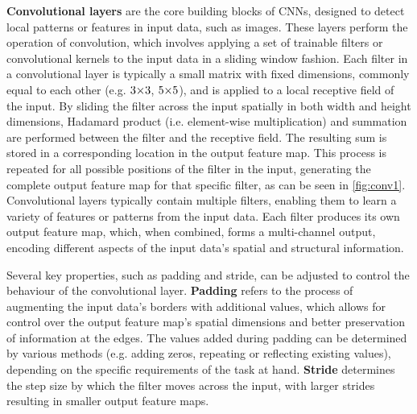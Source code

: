 \textbf{Convolutional layers} are the core building blocks of CNNs, designed to detect local patterns or features in input data, such as images. These layers perform the operation of convolution, which involves applying a set of trainable filters or convolutional kernels to the input data in a sliding window fashion. Each filter in a convolutional layer is typically a small matrix with fixed dimensions, commonly equal to each other (e.g. $3 {\times} 3$, $5 {\times} 5$), and is applied to a local receptive field of the input. By sliding the filter across the input spatially in both width and height dimensions, Hadamard product (i.e. element-wise multiplication) and summation are performed between the filter and the receptive field. The resulting sum is stored in a corresponding location in the output feature map. This process is repeated for all possible positions of the filter in the input, generating the complete output feature map for that specific filter, as can be seen in \autoref{fig:conv1}. Convolutional layers typically contain multiple filters, enabling them to learn a variety of features or patterns from the input data. Each filter produces its own output feature map, which, when combined, forms a multi-channel output, encoding different aspects of the input data's spatial and structural information.

Several key properties, such as padding and stride, can be adjusted to control the behaviour of the convolutional layer. \textbf{Padding} refers to the process of augmenting the input data's borders with additional values, which allows for control over the output feature map's spatial dimensions and better preservation of information at the edges. The values added during padding can be determined by various methods (e.g. adding zeros, repeating or reflecting existing values), depending on the specific requirements of the task at hand. \textbf{Stride} determines the step size by which the filter moves across the input, with larger strides resulting in smaller output feature maps.

